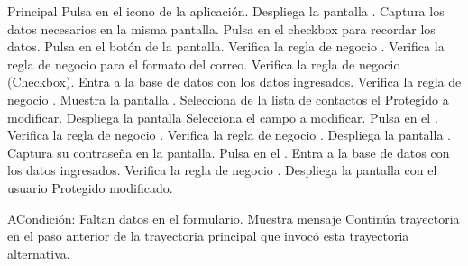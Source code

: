 	\begin{UCtrayectoria}{Principal}
		\UCpaso[\UCactor] Pulsa en el icono de la aplicación.
		\UCpaso[\UCsist] Despliega la pantalla .
		\UCpaso[\UCactor] Captura los datos necesarios en la misma pantalla.
		\UCpaso[\UCactor] Pulsa en el checkbox para recordar los datos.
		\UCpaso[\UCactor] Pulsa en el botón  de la pantalla.
		\UCpaso[\UCsist] Verifica la regla de negocio . 
		\UCpaso[\UCsist] Verifica la regla de negocio  para el formato del correo. 
		\UCpaso[\UCsist] Verifica la regla de negocio (Checkbox). 
		\UCpaso[\UCsist] Entra a la base de datos con los datos ingresados. 
		\UCpaso[\UCsist] Verifica la regla de negocio . 
		\UCpaso[\UCsist] Muestra la pantalla .
		\UCpaso[\UCactor] Selecciona de la lista de contactos el Protegido a modificar.
		\UCpaso[\UCactor] Despliega la pantalla 
		\UCpaso[\UCactor] Selecciona el campo a modificar.
		\UCpaso[\UCactor] Pulsa en el  .
		\UCpaso[\UCsist] Verifica la regla de negocio . 
		\UCpaso[\UCsist] Verifica la regla de negocio . 
		\UCpaso[\UCsist] Despliega la pantalla .
		\UCpaso[\UCactor] Captura su contraseña en la pantalla.
		\UCpaso[\UCactor] Pulsa en el  .
		\UCpaso[\UCsist] Entra a la base de datos con los datos ingresados.  
		\UCpaso[\UCsist] Verifica la regla de negocio . 
		\UCpaso[\UCsist] Despliega la pantalla  con el usuario Protegido modificado.
	\end{UCtrayectoria}
	\begin{UCtrayectoriaA}{A}{Condición: Faltan datos en el formulario.}
		\UCpaso[\UCsist] Muestra mensaje 
		\UCpaso[\UCsist] Continúa trayectoria en el paso anterior de la trayectoria  principal que invocó esta trayectoria alternativa. 
	\end{UCtrayectoriaA}
